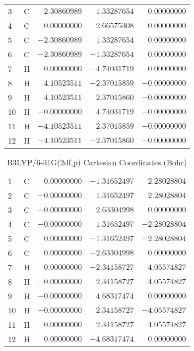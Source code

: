 \documentclass[10pt,oneside]{article}
\begin{document}
\begin{table}[h!]
\begin{multicols}{2}
\begin{tabular}{llrrr}
3  & C  & $ 2.30860989$ & $ 1.33287654$ & $ 0.00000000$ \\
4  & C  & $-0.00000000$ & $ 2.66575308$ & $ 0.00000000$ \\
5  & C  & $-2.30860989$ & $ 1.33287654$ & $ 0.00000000$ \\
6  & C  & $-2.30860989$ & $-1.33287654$ & $ 0.00000000$ \\
7  & H  & $-0.00000000$ & $-4.74031719$ & $-0.00000000$ \\
8  & H  & $ 4.10523511$ & $-2.37015859$ & $-0.00000000$ \\
9  & H  & $ 4.10523511$ & $ 2.37015860$ & $-0.00000000$ \\
10 & H  & $-0.00000000$ & $ 4.74031719$ & $-0.00000000$ \\
11 & H  & $-4.10523511$ & $ 2.37015859$ & $-0.00000000$ \\
12 & H  & $-4.10523511$ & $-2.37015860$ & $-0.00000000$ \\
\bottomrule
\end{tabular}
\end{multicols}
\end{table}

\begin{table}[h]
\centering
\caption{B3LYP/6-31G(2df,p) Cartesian Coordinates (Bohr)}
\begin{tabular}{llrrr}
\toprule
1  & C  & $ 0.00000000$ & $-1.31652497$ & $ 2.28028804$ \\
2  & C  & $-0.00000000$ & $ 1.31652497$ & $ 2.28028804$ \\
3  & C  & $-0.00000000$ & $ 2.63304998$ & $ 0.00000000$ \\
4  & C  & $-0.00000000$ & $ 1.31652497$ & $-2.28028804$ \\
5  & C  & $ 0.00000000$ & $-1.31652497$ & $-2.28028804$ \\
6  & C  & $ 0.00000000$ & $-2.63304998$ & $ 0.00000000$ \\
7  & H  & $ 0.00000000$ & $-2.34158727$ & $ 4.05574827$ \\
8  & H  & $-0.00000000$ & $ 2.34158727$ & $ 4.05574827$ \\
9  & H  & $-0.00000000$ & $ 4.68317474$ & $ 0.00000000$ \\
10 & H  & $-0.00000000$ & $ 2.34158727$ & $-4.05574827$ \\
11 & H  & $ 0.00000000$ & $-2.34158727$ & $-4.05574827$ \\
12 & H  & $ 0.00000000$ & $-4.68317474$ & $ 0.00000000$ \\
\bottomrule
\end{tabular}
\end{table}
\end{document}
